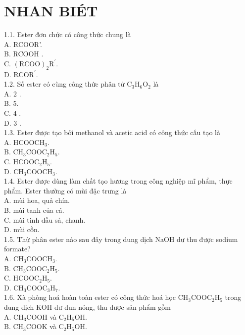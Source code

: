 \documentclass[10pt]{article}
\begin{document}
\section*{NHAN BIÉT}
1.1. Ester đơn chức có công thức chung là\\
A. RCOOR'.\\
B. RCOOH .\\
C. $(\mathrm{RCOO})_{2} \mathrm{R}^{\prime}$.\\
D. $\mathrm{RCOR}^{\prime}$.\\
1.2. Số ester có cùng công thức phân tử $\mathrm{C}_{3} \mathrm{H}_{6} \mathrm{O}_{2}$ là\\
A. 2 .\\
B. 5.\\
C. 4 .\\
D. 3 .\\
1.3. Ester được tạo bởi methanol và acetic acid có công thức cấu tạo là\\
A. $\mathrm{HCOOCH}_{3}$.\\
B. $\mathrm{CH}_{3} \mathrm{COOC}_{2} \mathrm{H}_{5}$.\\
C. $\mathrm{HCOOC}_{2} \mathrm{H}_{5}$.\\
D. $\mathrm{CH}_{3} \mathrm{COOCH}_{3}$.\\
1.4. Ester được dùng làm chất tạo hương trong công nghiệp mĩ phẩm, thực phẩm. Ester thường có mùi đặc trưng là\\
A. mùi hoa, quả chín.\\
B. mùi tanh của cá.\\
C. mùi tinh dầu sả, chanh.\\
D. mùi cồn.\\
1.5. Thừ phân ester nào sau đây trong dung dịch NaOH dư thu được sodium formate?\\
A. $\mathrm{CH}_{3} \mathrm{COOCH}_{3}$.\\
B. $\mathrm{CH}_{3} \mathrm{COOC}_{2} \mathrm{H}_{5}$.\\
C. $\mathrm{HCOOC}_{2} \mathrm{H}_{5}$.\\
D. $\mathrm{CH}_{3} \mathrm{COOC}_{3} \mathrm{H}_{7}$.\\
1.6. Xà phòng hoá hoàn toàn ester có công thức hoá học $\mathrm{CH}_{3} \mathrm{COOC}_{2} \mathrm{H}_{5}$ trong dung dịch KOH dư đun nóng, thu được sản phẩm gồm\\
A. $\mathrm{CH}_{3} \mathrm{COOH}$ và $\mathrm{C}_{2} \mathrm{H}_{5} \mathrm{OH}$.\\
B. $\mathrm{CH}_{3} \mathrm{COOK}$ và $\mathrm{C}_{2} \mathrm{H}_{5} \mathrm{OH}$.\\
\end{document}
